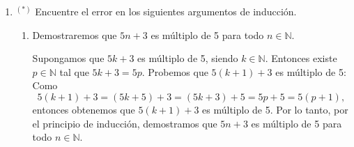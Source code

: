 \documentclass[a4paper,12pt,twoside,spanish,reqno]{amsbook}
\numberwithin{equation}{section}
\begin{document}
\begin{enumerate}[resume]
            {\it (Paso  inductivo) } Supongamos que $k \ge 1$ y el resultado  es cierto para los $h$ tales que  $1 \le h \le k$. Es decir que $a_h =3^h + (-1)^{h+1}2^h$ para $1 \le h \le k$ (hipótesis inductiva), entonces debemos probar que $a_{k+1}  =3^{k+1} + (-1)^{k+1+1}2^{k+1} = 3^{k+1} + (-1)^{k+2}2^{k+1}$. Ahora bien, 
            \begin{equation*}
            \begin{matrix}\qquad\qquad
            a_{k+1} &=& a_{k+1-1}+6a_{k+1-2}  \hfill &\quad \text{(por definición recursiva)} \hfill \\[4pt]
            &=& a_{k}+6a_{k-1}   \hfill &\hfill\\[4pt]
            &=&  3^k + (-1)^{k+1}2^k +6(3^{k-1} + (-1)^{k-1+1}2^{k-1}) \hfill &\quad \text{(por hipótesis inductiva})\hfill \\[4pt]
            &=&  3^k + (-1)^{k+1}2^k +6 \cdot 3^{k-1} + (-1)^{k} 6 \cdot 2^{k-1} \hfill  & \hfill\\[4pt]
            &=&  3^k + (-1)^{k+1}2^k +2 \cdot 3^{k} + (-1)^{k} 3 \cdot 2^{k}  \hfill  & \hfill\\[4pt]
            &=& (1 +2)3^k + ((-1)^{k+1} + (-1)^{k} 3)2^k   \hfill & \hfill\\[4pt]
            &=&  3 \cdot 3^k + (-1+ 3)(-1)^k2^k  \hfill  & \hfill\\[4pt]
            &=&  3^{k+1} + 2(-1)^k2^k  \hfill  & \hfill\\[4pt]
            &=& 3^{k+1} + (-1)^{k+2}2^{k+1}  \hfill  &\quad \text{($(-1)^{k+2} = (-1)^{k}$)}\hfill\\[4pt]
            \end{matrix}
            \end{equation*}

        
            \item${}^{(*)}$ Encuentre el error en los siguientes argumentos de inducción.
            \begin{enumerate}
                \item  Demostraremos que $5n+3$ es múltiplo de 5 para todo $n\in \mathbb N$.
                
                Supongamos que $5k+3$ es múltiplo de 5, siendo $k\in \mathbb N$. Entonces existe
                $p\in \mathbb N$ tal que  $5k+3=5p$. Probemos que $5(k+1)+3$ es múltiplo de 5:
                Como
                $$
                5(k+1)+3=(5k+5)+3=(5k+3)+5=5p+5=5(p+1),
                $$
                entonces obtenemos que $5(k+1)+3$ es múltiplo de 5. Por lo tanto, por el principio
                de inducción, demostramos que $5n+3$ es múltiplo de 5 para todo $n\in \mathbb
                N$.
                

\end{enumerate}
\end{enumerate}
\end{document}
